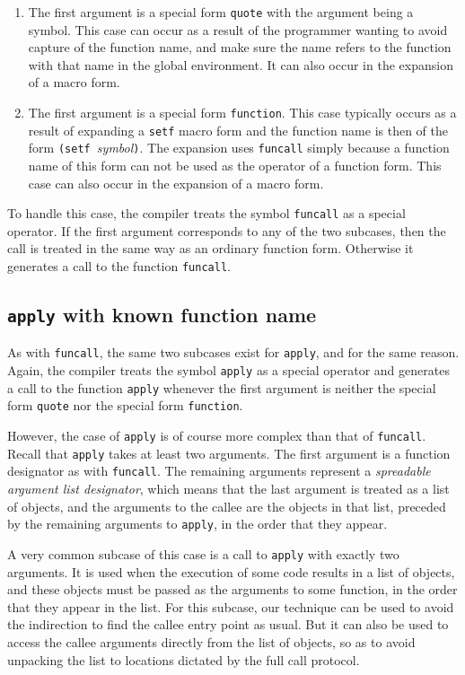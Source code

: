 \begin{enumerate}
\item The first argument is a special form \texttt{quote} with the
  argument being a symbol.  This case can occur as a result of the
  programmer wanting to avoid capture of the function name, and make
  sure the name refers to the function with that name in the global
  environment.  It can also occur in the expansion of a macro form.
\item The first argument is a special form \texttt{function}.  This
  case typically occurs as a result of expanding a \texttt{setf} macro
  form and the function name is then of the form \texttt{(setf
  }\textit{symbol}\texttt{)}.  The expansion uses \texttt{funcall}
  simply because a function name of this form can not be used as the
  operator of a function form.  This case can also occur in the
  expansion of a macro form.
\end{enumerate}

To handle this case, the compiler treats the symbol \texttt{funcall}
as a special operator.  If the first argument corresponds to any of
the two subcases, then the call is treated in the same way as an
ordinary function form.  Otherwise it generates a call to the function
\texttt{funcall}.

\subsection{\texttt{apply} with known function name}

As with \texttt{funcall}, the same two subcases exist for
\texttt{apply}, and for the same reason.  Again, the compiler treats
the symbol \texttt{apply} as a special operator and generates a call
to the function \texttt{apply} whenever the first argument is neither
the special form \texttt{quote} nor the special form
\texttt{function}.

However, the case of \texttt{apply} is of course more complex than
that of \texttt{funcall}.  Recall that \texttt{apply} takes at least
two arguments.  The first argument is a function designator as with
\texttt{funcall}.  The remaining arguments represent a
\emph{spreadable argument list designator}, which means that the last
argument is treated as a list of objects, and the arguments to the
callee are the objects in that list, preceded by the remaining
arguments to \texttt{apply}, in the order that they appear.

A very common subcase of this case is a call to \texttt{apply} with
exactly two arguments.  It is used when the execution of some code
results in a list of objects, and these objects must be passed as the
arguments to some function, in the order that they appear in the
list.  For this subcase, our technique can be used to avoid the
indirection to find the callee entry point as usual.  But it can also
be used to access the callee arguments directly from the list of
objects, so as to avoid unpacking the list to locations dictated by
the full call protocol.

